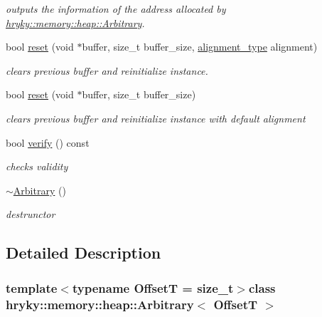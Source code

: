 \begin{DoxyCompactItemize}
\begin{DoxyCompactList}\small\item\em outputs the information of the address allocated by \hyperlink{classhryky_1_1memory_1_1heap_1_1_arbitrary}{hryky\-::memory\-::heap\-::\-Arbitrary}. \end{DoxyCompactList}\item 
bool \hyperlink{classhryky_1_1memory_1_1heap_1_1_arbitrary_ab67808c9f978e20899f0ec136344fda0}{reset} (void $\ast$buffer, size\-\_\-t buffer\-\_\-size, \hyperlink{namespacehryky_aee1af251193c2d308aaa68ef7e36a540}{alignment\-\_\-type} alignment)
\begin{DoxyCompactList}\small\item\em clears previous buffer and reinitialize instance. \end{DoxyCompactList}\item 
bool \hyperlink{classhryky_1_1memory_1_1heap_1_1_arbitrary_a67375f66666ee418ea6584876bd12b44}{reset} (void $\ast$buffer, size\-\_\-t buffer\-\_\-size)
\begin{DoxyCompactList}\small\item\em clears previous buffer and reinitialize instance with default alignment \end{DoxyCompactList}\item 
bool \hyperlink{classhryky_1_1memory_1_1heap_1_1_arbitrary_a0fe78b479fc34967df52afa280c8d16d}{verify} () const 
\begin{DoxyCompactList}\small\item\em checks validity \end{DoxyCompactList}\item 
\hyperlink{classhryky_1_1memory_1_1heap_1_1_arbitrary_a836e315fb69fb1b7ea39869484d0229c}{$\sim$\-Arbitrary} ()
\begin{DoxyCompactList}\small\item\em destrunctor \end{DoxyCompactList}\end{DoxyCompactItemize}


\subsection{Detailed Description}
\subsubsection*{template$<$typename Offset\-T = size\-\_\-t$>$class hryky\-::memory\-::heap\-::\-Arbitrary$<$ Offset\-T $>$}

